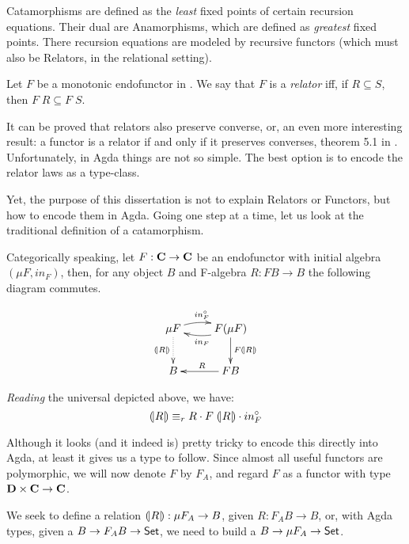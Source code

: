 Catamorphisms are defined as the \emph{least} fixed points of certain recursion equations. Their
dual are Anamorphisms, which are defined as \emph{greatest} fixed points. There recursion equations
are modeled by recursive functors (which must also be Relators, in the relational setting).\\

\begin{mydef}[Relator]
Let $F$ be a monotonic endofunctor in . We say that $F$ is a \emph{relator}
iff, if $R \subseteq S$, then $F\;R \subseteq F\;S$.
\end{mydef}

It can be proved that relators also preserve converse, or, an even more interesting result: a functor
is a relator if and only if it preserves converses, theorem 5.1 in \cite{Bird97}. Unfortunately,
in Agda things are not so simple. The best option is to encode the relator laws as a type-class.


Yet, the purpose of this dissertation is not to explain Relators or Functors, but how to encode them
in Agda. Going one step at a time, let us look at the traditional definition of a catamorphism.

Categorically speaking, let $F : \textbf{C} \rightarrow \textbf{C}$ be an endofunctor with
initial algebra $(\mu F , in_F)$, then, for any object $B$ and F-algebra $R : F B \rightarrow B$
the following diagram commutes.

\begin{displaymath}
\xymatrix{%
  \mu F \ar@/^/[r]^{in_F^\circ} \ar@{..>}[d]_{\scata{R}}
     & F (\mu F) \ar@/^/[l]^{in_F} \ar[d]^{F \scata{R}} \\
  B     & \ar[l]_{R} F B
}
\end{displaymath}

\emph{Reading} the universal depicted above, we have:
\[ \mathopen{(\!|}R\mathclose{|\!)} \equiv_r R \cdot F\;\mathopen{(\!|}R\mathclose{|\!)} \cdot in_F^\circ \]

Although it looks (and it indeed is) pretty tricky to encode this directly into Agda, at least it gives
us a type to follow. Since almost all useful functors are polymorphic, we will now
denote $F$ by $F_A$, and regard $F$ as a functor with type $\textbf{D} \times \textbf{C} \rightarrow \textbf{C}$.

We seek to define a relation $\mathopen{(\!|}R\mathclose{|\!)} : \mu F_A \rightarrow B$, given $R : F_A B \rightarrow B$,
or, with Agda types, given a $B \rightarrow F_A B \rightarrow \D{Set}$, we need to build a $B \rightarrow \mu F_A \rightarrow \D{Set}$.

